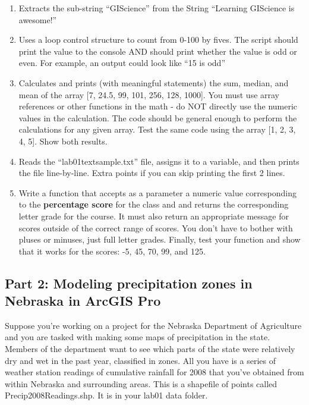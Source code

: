 \documentclass[]{article}
\begin{document}
\begin{enumerate}
\def\labelenumi{\arabic{enumi}.}
\item
  Extracts the sub-string ``GIScience'' from the String ``Learning
  GIScience is awesome!''
\item
  Uses a loop control structure to count from 0-100 by fives. The script
  should print the value to the console AND should print whether the
  value is odd or even. For example, an output could look like ``15 is
  odd''
\item
  Calculates and prints (with meaningful statements) the sum, median,
  and mean of the array {[}7, 24.5, 99, 101, 256, 128, 1000{]}. You must
  use array references or other functions in the math - do NOT directly
  use the numeric values in the calculation. The code should be general
  enough to perform the calculations for any given array. Test the same
  code using the array {[}1, 2, 3, 4, 5{]}. Show both results.
\item
  Reads the ``lab01textsample.txt'' file, assigns it to a variable, and
  then prints the file line-by-line. Extra points if you can skip
  printing the first 2 lines.
\item
  Write a function that accepts as a parameter a numeric value
  corresponding to the \textbf{percentage score} for the class and and
  returns the corresponding letter grade for the course. It must also
  return an appropriate message for scores outside of the correct range
  of scores. You don't have to bother with pluses or minuses, just full
  letter grades. Finally, test your function and show that it works for
  the scores: -5, 45, 70, 99, and 125.
\end{enumerate}

\newpage

\hypertarget{part-2-modeling-precipitation-zones-in-nebraska-in-arcgis-pro}{%
\subsection{Part 2: Modeling precipitation zones in Nebraska in ArcGIS
Pro}\label{part-2-modeling-precipitation-zones-in-nebraska-in-arcgis-pro}}

Suppose you're working on a project for the Nebraska Department of
Agriculture and you are tasked with making some maps of precipitation in
the state. Members of the department want to see which parts of the
state were relatively dry and wet in the past year, classified in zones.
All you have is a series of weather station readings of cumulative
rainfall for 2008 that you've obtained from within Nebraska and
surrounding areas. This is a shapefile of points called
Precip2008Readings.shp. It is in your lab01 data folder.
\end{document}

